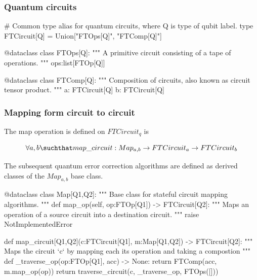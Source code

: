 \subsubsection{Quantum circuits}

  \begin{python}
  # Common type alias for quantum circuits, where Q is type of qubit label.
  type FTCircuit[Q] = Union["FTOps[Q]", "FTComp[Q]"]

  @dataclass
  class FTOps[Q]:
    """ A primitive circuit consisting of a tape of operations. """
    ops:list[FTOp[Q]]

  @dataclass
  class FTComp[Q]:
    """ Composition of circuits, also known as circuit tensor product. """
    a: FTCircuit[Q]
    b: FTCircuit[Q]
  \end{python}


\subsubsection{Mapping form circuit to circuit}

The map operation is defined on $FTCircuit_q$ is

$$
\forall a,b \suchthat map\_circuit : Map_{a,b} \to FTCircuit_a \to FTCircuit_b
$$

The subsequent quantum error correction algorithms are defined as derived classes of the
$Map_{a,b}$ base class.

  \begin{comment}
    \begin{sh}
    printf '\\begin{%
    cat $PROJECT_ROOT/python/qecsurface/type.py | sedlines.sh 'Circuit mapping'
    printf '\\end{%
    \end{sh}
  \end{comment}

  \begin{python}
  @dataclass
  class Map[Q1,Q2]:
    """ Base class for stateful circuit mapping algorithms. """
    def map_op(self, op:FTOp[Q1]) -> FTCircuit[Q2]:
      """ Maps an operation of a source circuit into a destination circuit. """
      raise NotImplementedError


  def map_circuit[Q1,Q2](c:FTCircuit[Q1], m:Map[Q1,Q2]) -> FTCircuit[Q2]:
    """ Maps the circuit `c` by mapping each its operation and taking a compostion """
    def _traverse_op(op:FTOp[Q1], acc) -> None:
      return FTComp(acc, m.map_op(op))
    return traverse_circuit(c, _traverse_op, FTOps([]))
  \end{python}

